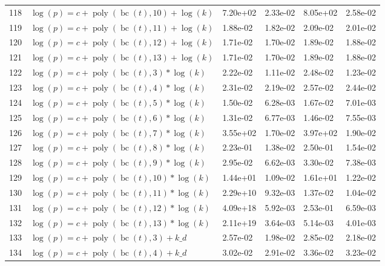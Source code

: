 \documentclass[12pt,a4paper]{article}
\DeclareMathOperator{\bc}{bc}
\DeclareMathOperator{\poly}{poly}
\begin{document}
\begin{longtable}[t]{ll>{\raggedleft\arraybackslash}p{2cm}>{\raggedleft\arraybackslash}p{2cm}>{\raggedleft\arraybackslash}p{2cm}>{\raggedleft\arraybackslash}p{2cm}}
118 & $\log(p) = c + \poly\left( \bc(t), 10 \right) + \log(k)$ & 7.20e+02 & 2.33e-02 & 8.05e+02 & 2.58e-02\\
\rowcolor{gray!6}  119 & $\log(p) = c + \poly\left( \bc(t), 11 \right) + \log(k)$ & 1.88e-02 & 1.82e-02 & 2.09e-02 & 2.01e-02\\
120 & $\log(p) = c + \poly\left( \bc(t), 12 \right) + \log(k)$ & 1.71e-02 & 1.70e-02 & 1.89e-02 & 1.88e-02\\
\rowcolor{gray!6}  121 & $\log(p) = c + \poly\left( \bc(t), 13 \right) + \log(k)$ & 1.71e-02 & 1.70e-02 & 1.89e-02 & 1.88e-02\\
122 & $\log(p) = c + \poly\left( \bc(t), 3 \right) * \log(k)$ & 2.22e-02 & 1.11e-02 & 2.48e-02 & 1.23e-02\\
\rowcolor{gray!6}  123 & $\log(p) = c + \poly\left( \bc(t), 4 \right) * \log(k)$ & 2.31e-02 & 2.19e-02 & 2.57e-02 & 2.44e-02\\
124 & $\log(p) = c + \poly\left( \bc(t), 5 \right) * \log(k)$ & 1.50e-02 & 6.28e-03 & 1.67e-02 & 7.01e-03\\
\rowcolor{gray!6}  125 & $\log(p) = c + \poly\left( \bc(t), 6 \right) * \log(k)$ & 1.31e-02 & 6.77e-03 & 1.46e-02 & 7.55e-03\\
126 & $\log(p) = c + \poly\left( \bc(t), 7 \right) * \log(k)$ & 3.55e+02 & 1.70e-02 & 3.97e+02 & 1.90e-02\\
\rowcolor{gray!6}  127 & $\log(p) = c + \poly\left( \bc(t), 8 \right) * \log(k)$ & 2.23e-01 & 1.38e-02 & 2.50e-01 & 1.54e-02\\
128 & $\log(p) = c + \poly\left( \bc(t), 9 \right) * \log(k)$ & 2.95e-02 & 6.62e-03 & 3.30e-02 & 7.38e-03\\
\rowcolor{gray!6}  129 & $\log(p) = c + \poly\left( \bc(t), 10 \right) * \log(k)$ & 1.44e+01 & 1.09e-02 & 1.61e+01 & 1.22e-02\\
130 & $\log(p) = c + \poly\left( \bc(t), 11 \right) * \log(k)$ & 2.29e+10 & 9.32e-03 & 1.37e-02 & 1.04e-02\\
\rowcolor{gray!6}  131 & $\log(p) = c + \poly\left( \bc(t), 12 \right) * \log(k)$ & 4.09e+18 & 5.92e-03 & 2.53e-01 & 6.59e-03\\
132 & $\log(p) = c + \poly\left( \bc(t), 13 \right) * \log(k)$ & 2.11e+19 & 3.64e-03 & 5.14e-03 & 4.01e-03\\
\rowcolor{gray!6}  133 & $\log(p) = c + \poly\left( \bc(t), 3 \right) + k\_d$ & 2.57e-02 & 1.98e-02 & 2.85e-02 & 2.18e-02\\
134 & $\log(p) = c + \poly\left( \bc(t), 4 \right) + k\_d$ & 3.02e-02 & 2.91e-02 & 3.36e-02 & 3.23e-02\\

\end{longtable}
\end{document}
